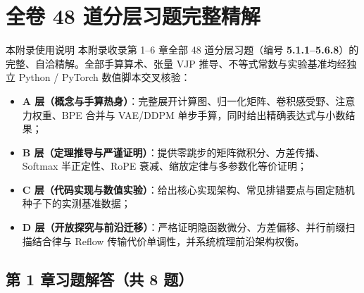\renewcommand{\chapWatermarkNum}{\thechapter}
\renewcommand{\chaptermark}[1]{\markboth{附录 \thechapter\quad #1}{}}
\chapter[全卷 48 道分层习题完整精解]{全卷 48 道分层习题完整精解}
\label{app:solutions}

\begin{chapIntro}{本附录使用说明}
本附录收录第 1--6 章全部 48 道分层习题（编号 \textbf{5.1.1--5.6.8}）的完整、自洽精解。全部手算算术、张量 VJP 推导、不等式常数与实验基准均经独立 Python / PyTorch 数值脚本交叉核验：
\begin{itemize}
  \item \textbf{A 层（概念与手算热身）}：完整展开计算图、归一化矩阵、卷积感受野、注意力权重、BPE 合并与 VAE/DDPM 单步手算，同时给出精确表达式与小数结果；
  \item \textbf{B 层（定理推导与严谨证明）}：提供零跳步的矩阵微积分、方差传播、Softmax 半正定性、RoPE 衰减、缩放定律与多参数化等价证明；
  \item \textbf{C 层（代码实现与数值实验）}：给出核心实现架构、常见排错要点与固定随机种子下的实测基准数据；
  \item \textbf{D 层（开放探究与前沿迁移）}：严格证明隐函数微分、方差偏移、并行前缀扫描结合律与 Reflow 传输代价单调性，并系统梳理前沿架构权衡。
\end{itemize}
\end{chapIntro}

\section*{第 1 章习题解答（共 8 题）}

